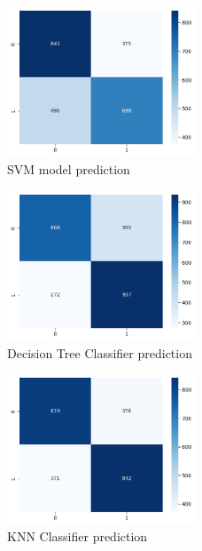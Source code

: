 
\begin{figure}
\includegraphics[width=0.5\textwidth]{img/svm_pred.png}
\caption{SVM model prediction}
\label{fig}
\end{figure}

\begin{figure}
\includegraphics[width=0.5\textwidth]{img/dec_pred.png}
\caption{Decision Tree Classifier prediction}
\label{fig}
\end{figure}

\begin{figure}
\includegraphics[width=0.5\textwidth]{img/knn_pred.png}
\caption{KNN Classifier prediction}
\label{fig}
\end{figure}

